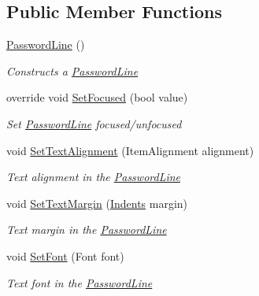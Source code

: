 \subsection*{Public Member Functions}
\begin{DoxyCompactItemize}
\item 
\mbox{\hyperlink{class_space_v_i_l_1_1_password_line_a3630df351295bbb158675c718a4071be}{Password\+Line}} ()
\begin{DoxyCompactList}\small\item\em Constructs a \mbox{\hyperlink{class_space_v_i_l_1_1_password_line}{Password\+Line}} \end{DoxyCompactList}\item 
override void \mbox{\hyperlink{class_space_v_i_l_1_1_password_line_ac82ce0352c02dab703ac18e6d81798a5}{Set\+Focused}} (bool value)
\begin{DoxyCompactList}\small\item\em Set \mbox{\hyperlink{class_space_v_i_l_1_1_password_line}{Password\+Line}} focused/unfocused \end{DoxyCompactList}\item 
void \mbox{\hyperlink{class_space_v_i_l_1_1_password_line_a578351e7e63ba70e457e2779fb692c6f}{Set\+Text\+Alignment}} (Item\+Alignment alignment)
\begin{DoxyCompactList}\small\item\em Text alignment in the \mbox{\hyperlink{class_space_v_i_l_1_1_password_line}{Password\+Line}} \end{DoxyCompactList}\item 
void \mbox{\hyperlink{class_space_v_i_l_1_1_password_line_affd2b37e2f8bc81d1633b629bae29dfd}{Set\+Text\+Margin}} (\mbox{\hyperlink{struct_space_v_i_l_1_1_decorations_1_1_indents}{Indents}} margin)
\begin{DoxyCompactList}\small\item\em Text margin in the \mbox{\hyperlink{class_space_v_i_l_1_1_password_line}{Password\+Line}} \end{DoxyCompactList}\item 
void \mbox{\hyperlink{class_space_v_i_l_1_1_password_line_a39c41fdf3ef352cd2b51d5cee342dfa4}{Set\+Font}} (Font font)
\begin{DoxyCompactList}\small\item\em Text font in the \mbox{\hyperlink{class_space_v_i_l_1_1_password_line}{Password\+Line}} \end{DoxyCompactList}\item 
\mbox{\label{class_space_v_i_l_1_1_password_line_a13f9c6c3d476f3a3d6483b08a414b744}} 

\end{DoxyCompactItemize}
